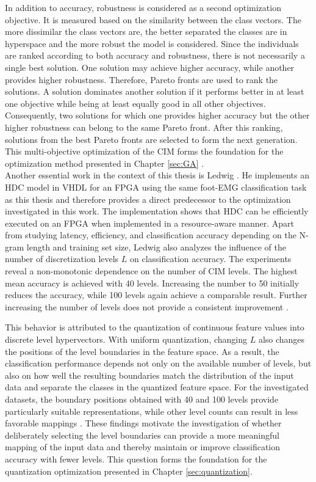     In addition to accuracy, robustness is considered as a second optimization objective. It is measured based on the similarity between the class vectors. The more dissimilar the class vectors are, the better separated the classes are in hyperspace and the more robust the model is considered. Since the individuals are ranked according to both accuracy and robustness, there is not necessarily a single best solution. One solution may achieve higher accuracy, while another provides higher robustness. Therefore, Pareto fronts are used to rank the solutions. A solution dominates another solution if it performs better in at least one objective while being at least equally good in all other objectives. Consequently, two solutions for which one provides higher accuracy but the other higher robustness can belong to the same Pareto front. After this ranking, solutions from the best Pareto fronts are selected to form the next generation. This multi-objective optimization of the CIM forms the foundation for the optimization method presented in Chapter \ref{sec:GA} \cite{basaklar_hypervector_2021}. \\

    Another essential work in the context of this thesis is Ledwig \cite{ledwig_vdl-implementierung_2025}. He implements an HDC model in VHDL for an FPGA using the same foot-EMG classification task as this thesis and therefore provides a direct predecessor to the optimization investigated in this work. The implementation shows that HDC can be efficiently executed on an FPGA when implemented in a resource-aware manner. Apart from studying latency, efficiency, and classification accuracy depending on the N-gram length and training set size, Ledwig also analyzes the influence of the number of discretization levels $L$ on classification accuracy. The experiments reveal a non-monotonic dependence on the number of CIM levels. The highest mean accuracy is achieved with 40 levels. Increasing the number to 50 initially reduces the accuracy, while 100 levels again achieve a comparable result. Further increasing the number of levels does not provide a consistent improvement \cite{ledwig_vdl-implementierung_2025}.
    
    This behavior is attributed to the quantization of continuous feature values into discrete level hypervectors. With uniform quantization, changing $L$ also changes the positions of the level boundaries in the feature space. As a result, the classification performance depends not only on the available number of levels, but also on how well the resulting boundaries match the distribution of the input data and separate the classes in the quantized feature space. For the investigated datasets, the boundary positions obtained with 40 and 100 levels provide particularly suitable representations, while other level counts can result in less favorable mappings \cite{ledwig_vdl-implementierung_2025}. These findings motivate the investigation of whether deliberately selecting the level boundaries can provide a more meaningful mapping of the input data and thereby maintain or improve classification accuracy with fewer levels. This question forms the foundation for the quantization optimization presented in Chapter \ref{sec:quantization}.
    
